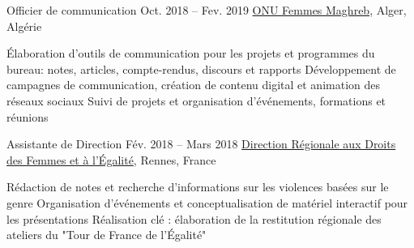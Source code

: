 \begin{joblist}[13.2][7.8][3.4]

\item[Officier de communication]{Oct. 2018 -- Fev. 2019 }     
	{
	\href{http://maghreb.unwomen.org/fr}{ONU Femmes Maghreb}, Alger, Algérie
	}     
	{
		\normalsize{
		\vspace{-0.5cm}
		\begin{itemize}
			  \iftbftiny \setlength\itemsep{-3pt} \fi
			  \cvitem[\checkmark] Élaboration d'outils de communication pour les projets et programmes du bureau: notes, articles, compte-rendus, discours et rapports  
              \cvitem[\checkmark] Développement de campagnes de communication, création de contenu digital et animation des réseaux sociaux
			  \cvitem[\checkmark] Suivi de projets et organisation d'événements, formations et réunions 
			  
			  
			  
		\end{itemize}      
		}
	}


\item[Assistante de Direction]{Fév. 2018 -- Mars 2018 }     
	{
	\href{https://www.egalite-femmes-hommes.gouv.fr/le-secretariat-d-etat/organisation-du-ministere/services-territoriaux/annuaire-des-equipes-regionales-et-departementales/}{Direction Régionale aux Droits des Femmes et à l'Égalité}, Rennes, France
	}     
	{
		\normalsize{
		\iftbftiny \vspace{-0.5cm} \fi
		\begin{itemize}
			  \iftbftiny \setlength\itemsep{-3pt} \fi
			  \cvitem[\checkmark] Rédaction de notes et recherche d'informations sur les violences basées sur le genre
			  \cvitem[\checkmark] Organisation d'événements et conceptualisation de matériel interactif pour les présentations
              \cvitem[\checkmark] Réalisation clé : élaboration de la restitution régionale des ateliers du "Tour de France de l’Égalité"                                                            
			 

\end{itemize}}}
\end{joblist}
